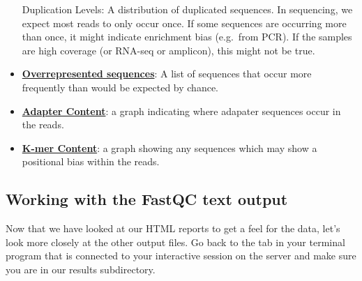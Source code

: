 \documentclass[
  letterpaper,
  DIV=11,
  numbers=noendperiod]{scrreprt}
\newenvironment{Shaded}{\begin{snugshade}}{\end{snugshade}}
\newcommand{\ExtensionTok}[1]{\textcolor[rgb]{0.00,0.23,0.31}{#1}}
\newcommand{\NormalTok}[1]{\textcolor[rgb]{0.00,0.23,0.31}{#1}}
\begin{document}
\begin{itemize}
{{  Duplication Levels}}: A distribution of duplicated sequences. In
  sequencing, we expect most reads to only occur once. If some sequences
  are occurring more than once, it might indicate enrichment bias
  (e.g.~from PCR). If the samples are high coverage (or RNA-seq or
  amplicon), this might not be true.
\item
  \href{https://www.bioinformatics.babraham.ac.uk/projects/fastqc/Help/3\%20Analysis\%20Modules/9\%20Overrepresented\%20Sequences.html}{\textbf{Overrepresented
  sequences}}: A list of sequences that occur more frequently than would
  be expected by chance.
\item
  \href{https://www.bioinformatics.babraham.ac.uk/projects/fastqc/Help/3\%20Analysis\%20Modules/10\%20Adapter\%20Content.html}{\textbf{Adapter
  Content}}: a graph indicating where adapater sequences occur in the
  reads.
\item
  \href{https://www.bioinformatics.babraham.ac.uk/projects/fastqc/Help/3\%20Analysis\%20Modules/11\%20Kmer\%20Content.html}{\textbf{K-mer
  Content}}: a graph showing any sequences which may show a positional
  bias within the reads.
\end{itemize}

\hypertarget{working-with-the-fastqc-text-output}{%
\subsection{Working with the FastQC text
output}\label{working-with-the-fastqc-text-output}}

Now that we have looked at our HTML reports to get a feel for the data,
let's look more closely at the other output files. Go back to the tab in
your terminal program that is connected to your interactive session on
the server and make sure you are in our results subdirectory.

\begin{Shaded}
\end{Shaded}
\end{document}
